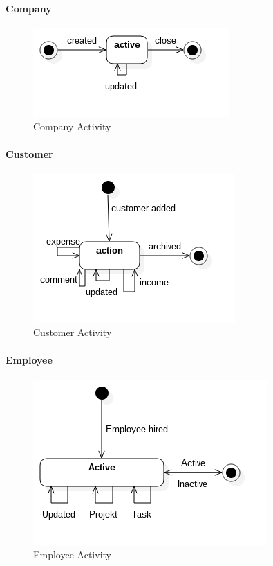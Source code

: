 \paragraph{Company}

\begin{figure}[H]
    \centering
    \includegraphics[scale=0.7]{Images/ProblemDomain/companyActivityDiagram.png}
    \caption{Company Activity}
    \label{fig:companyActivityDiagram}
\end{figure}

\paragraph{Customer}

\begin{figure}[H]
    \centering
    \includegraphics[scale=0.7]{Images/ProblemDomain/customerActivityDiagram.png}
    \caption{Customer Activity}
    \label{fig:customerActivityDiagram}
\end{figure}

\paragraph{Employee}

\begin{figure}[H]
    \centering
    \includegraphics[scale=0.7]{Images/ProblemDomain/employeeActivityDiagram.png}
    \caption{Employee Activity}
    \label{fig:employeeActivityDiagram}
\end{figure}

